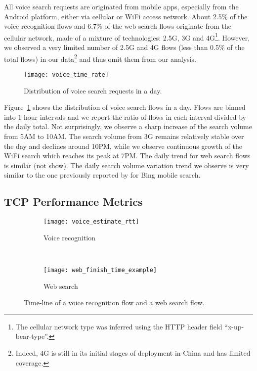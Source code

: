 All voice search requests are originated from mobile apps, especially from the Android platform, either via cellular or WiFi access network. About 2.5\% of the voice recognition flows and 6.7\% of the web search flows originate from the cellular network, made of a mixture of technologies: 2.5G, 3G and 4G\footnote{The cellular network type was inferred using the HTTP header field ``x-up-bear-type''.}. However, we observed a very limited number of 2.5G and 4G flows (less than 0.5\% of the total flows) in our data\footnote{Indeed, 4G is still in its initial stages of deployment in China and has limited coverage.} and thus omit them from our analysis.

\begin{figure}[th]
\centering
\texttt{[image: voice\_time\_rate]}
\caption{Distribution of voice search requests in a day.}
\label{fig:voice_time_rate}
\end{figure}

Figure~\ref{fig:voice_time_rate} shows the distribution of voice search flows in a day. Flows are binned into 1-hour intervals and we report the ratio of flows in each interval divided by the daily total. Not surprisingly, we observe a sharp increase of the search volume from 5AM to 10AM. The search volume from 3G remains relatively stable over the day and declines around 10PM, while we observe continuous growth of the WiFi search which reaches its peak at 7PM. The daily trend for web search flows is similar (not show). The daily search volume variation trend we observe is very similar to the one previously reported by \cite{Song:2013:EEU:2488388.2488493} for Bing mobile search.

\subsection{TCP Performance Metrics}

\begin{figure}[ht]
\centering
\begin{subfigure}[b]{0.6\linewidth}
	\texttt{[image: voice\_estimate\_rtt]}
\caption{Voice recognition}
\label{fig:voice_estimate_rtt}
\end{subfigure} \\
\begin{subfigure}[b]{0.6\linewidth}
	\texttt{[image: web\_finish\_time\_example]}
\caption{Web search}
\label{fig:web_finish_time_example}
\end{subfigure}
\caption{Time-line of a voice recognition flow and a web search flow.}
\label{fig:time_line}
\end{figure}

